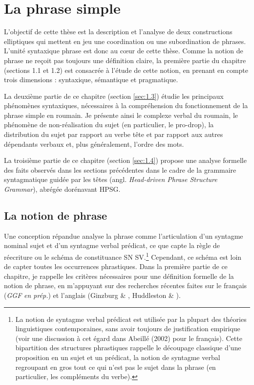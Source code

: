 
\section{La phrase simple}
L'objectif de cette thèse est la description et l'analyse de deux constructions elliptiques qui mettent en jeu une coordination ou une subordination de phrases. L'unité syntaxique phrase est donc au c{\oe}ur de cette thèse. Comme la notion de phrase ne reçoit pas toujours une définition claire, la première partie du chapitre (sections 1.1 et 1.2) est consacrée à l'étude de cette notion, en prenant en compte trois dimensions : syntaxique, sémantique et pragmatique.  

La deuxième partie de ce chapitre (section \ref{sec:1.3}) étudie les principaux phénomènes syntaxiques, nécessaires à la compréhension du fonctionnement de la phrase simple en roumain. Je présente ainsi le complexe verbal du roumain, le phénomène de non-réalisation du sujet (en particulier, le pro-drop), la distribution du sujet par rapport au verbe tête et par rapport aux autres dépendants verbaux et, plus généralement, l'ordre des mots.  

La troisième partie de ce chapitre (section \ref{sec:1.4}) propose une analyse formelle des faits observés dans les sections précédentes dans le cadre de la grammaire syntagmatique guidée par les têtes (angl. \textit{Head-driven Phrase Structure Grammar}), abrégée dorénavant HPSG.

\subsection{La notion de phrase}
\label{bkm:Ref299302849}Une conception répandue analyse la phrase comme l'articulation d'un syntagme nominal sujet et d'un syntagme verbal prédicat, ce que capte la règle de réecriture ou le schéma de constituance SN SV.\footnote{La notion de syntagme verbal prédicat est utilisée par la plupart des théories linguistiques contemporaines, sans avoir toujours de justification empirique (voir une discussion à cet égard dans Abeillé (2002) pour le français). Cette bipartition des structures phrastiques rappelle le découpage classique d'une proposition en un sujet et un prédicat, la notion de syntagme verbal regroupant en gros tout ce qui n'est pas le sujet dans la phrase (en particulier, les compléments du verbe).}  Cependant, ce schéma est loin de capter toutes les occurrences phrastiques. Dans la première partie de ce chapitre, je rappelle les critères nécessaires pour une définition formelle de la notion de phrase, en m'appuyant sur des recherches récentes faites sur le français (\textit{GGF} \textit{en prép.}) et l'anglais (Ginzburg \& \citet{Sag2000}, Huddleston \& \citet{Pullum2002}). 

